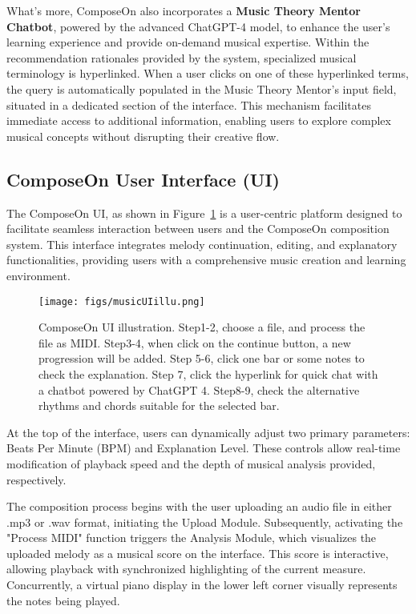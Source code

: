 What's more, ComposeOn also incorporates a \textbf{Music Theory Mentor Chatbot}, powered by the advanced ChatGPT-4 model, to enhance the user's learning experience and provide on-demand musical expertise. Within the recommendation rationales provided by the system, specialized musical terminology is hyperlinked. When a user clicks on one of these hyperlinked terms, the query is automatically populated in the Music Theory Mentor's input field, situated in a dedicated section of the interface. This mechanism facilitates immediate access to additional information, enabling users to explore complex musical concepts without disrupting their creative flow.

\subsection{ComposeOn User Interface (UI)}
The ComposeOn UI, as shown in Figure~\ref{fig:musicUI}  is a user-centric platform designed to facilitate seamless interaction between users and the ComposeOn composition system. This interface integrates melody continuation, editing, and explanatory functionalities, providing users with a comprehensive music creation and learning environment.

\begin{figure}[h]
\centering
\texttt{[image: figs/musicUIillu.png]}
\caption{ComposeOn UI illustration. Step1-2, choose a file, and process the file as MIDI. Step3-4, when click on the continue button, a new progression will be added. Step 5-6, click one bar or some notes to check the explanation. Step 7, click the hyperlink for quick chat with a chatbot powered by ChatGPT 4. Step8-9, check the alternative rhythms and chords suitable for the selected bar.}
\label{fig:musicUI}
\end{figure}

At the top of the interface, users can dynamically adjust two primary parameters: Beats Per Minute (BPM) and Explanation Level. These controls allow real-time modification of playback speed and the depth of musical analysis provided, respectively.

The composition process begins with the user uploading an audio file in either .mp3 or .wav format, initiating the Upload Module. Subsequently, activating the "Process MIDI" function triggers the Analysis Module, which visualizes the uploaded melody as a musical score on the interface. This score is interactive, allowing playback with synchronized highlighting of the current measure. Concurrently, a virtual piano display in the lower left corner visually represents the notes being played.

